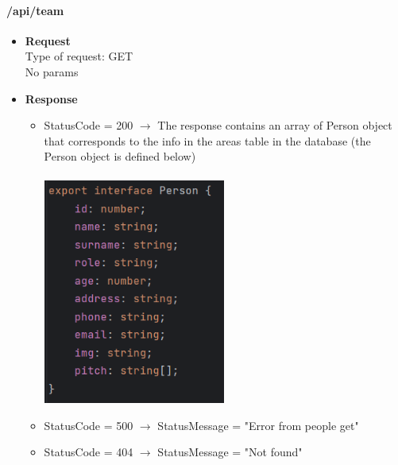 \documentclass[11pt, letterpaper]{article}
\begin{document}
\paragraph{/api/team}
\begin{itemize}
    \item \textbf{Request} \\ Type of request: GET \\ No params 
    \item \textbf{Response} \begin{itemize}
        \item StatusCode = 200 $\rightarrow$ The response contains an array of Person object that corresponds to the info in the areas table in the database (the Person object is defined below)\\ \\
            \includegraphics[width=6cm]{images/API/Person.png}
        \item StatusCode = 500 $\rightarrow$ StatusMessage = "Error from people get"
        \item StatusCode = 404 $\rightarrow$ StatusMessage = "Not found"
    \end{itemize} 
\end{itemize}
\end{document}
